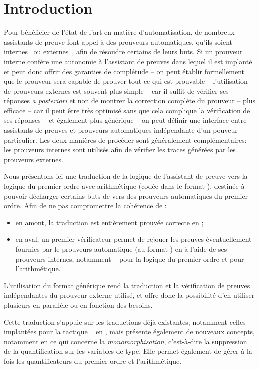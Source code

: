 \section{Introduction}

Pour bénéficier de l'état de l'art en matière d'automatisation, de
nombreux assistants de preuve font appel à des prouveurs automatiques,
qu'ils soient internes~\cite{Hurd05,Lescuyer11} ou
externes~\cite{Paulson10,DBLP:conf/cpp/ArmandFGKTW11}, afin de résoudre
certains de leurs buts. Si un prouveur interne confère une autonomie à
l'assistant de preuves dans lequel il est implanté et peut donc offrir
des garanties de complétude -- on peut établir formellement que le
prouveur sera capable de prouver tout ce qui est prouvable --
l'utilisation de prouveurs externes est souvent plus simple -- car il
suffit de vérifier ses réponses \emph{a posteriori} et non de montrer la
correction complète du prouveur -- plus efficace -- car il peut être
très optimisé sans que cela complique la vérification de ses réponses --
et également plus générique -- on peut définir une interface entre
assistants de preuves et prouveurs automatiques indépendante d'un
pouveur particulier. Les deux manières de procéder sont généralement
complémentaires: les prouveurs internes sont utilisés afin de vérifier
les traces générées par les prouveurs externes.

Nous présentons ici une traduction de la logique de l'assistant de
preuve \holfour vers la logique du premier ordre avec arithmétique
(codée dans le format \tff), destinée à pouvoir décharger certains buts
de \holfour vers des prouveurs automatiques du premier ordre. Afin de ne
pas compromettre la cohérence de \holfour:
\begin{itemize}
\item en amont, la traduction est entièrement prouvée correcte en
  \holfour;
\item en aval, un premier vérificateur permet de rejouer les preuves
  éventuellement fournies par le prouveurs automatique (au format \tff)
  en \holfour à l'aide de ses prouveurs internes, notamment
  \metis~\cite{Hurd05} pour la logique du premier ordre et \cooper pour
  l'arithmétique.
\end{itemize}
L'utilisation du format \tff générique rend la traduction et la
vérification de preuves indépendantes du prouveur externe utilisé, et
offre donc la possibilité d'en utiliser plusieurs en parallèle ou en
fonction des besoins.

Cette traduction s'appuie sur les traductions déjà existantes, notamment
celles implantées pour la tactique \sledgehammer~\cite{Paulson10} en
\isabellehol, mais présente également de nouveaux concepts, notamment en
ce qui concerne la \emph{monomorphisation}, c'est-à-dire la suppression
de la quantification sur les variables de type. Elle permet également de
gérer à la fois les quantificateurs du premier ordre et l'arithmétique.

